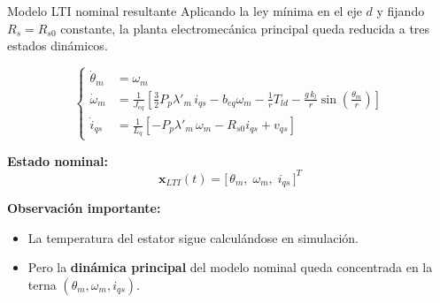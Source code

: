 \documentclass[aspectratio=169,t]{beamer}
\begin{document}
\begin{frame}{Modelo LTI nominal resultante}
{\small\color{uncGray}Aplicando la ley mínima en el eje $d$ y fijando $R_s=R_{s0}$ constante, la planta electromecánica principal queda reducida a tres estados dinámicos.}\par
\vspace{2mm}

\footnotesize
\begin{equation*}
\left\{
\begin{aligned}
\dot{\theta}_m &= \omega_m \\[2pt]
\dot{\omega}_m &= \frac{1}{J_{eq}}\!\left[\frac{3}{2}P_p\lambda'_m\,i_{qs}-b_{eq}\omega_m-\frac{1}{r}T_{ld}-\frac{g\,k_l}{r}\sin\!\left(\frac{\theta_m}{r}\right)\right] \\[4pt]
\dot{i}_{qs} &= \frac{1}{L_q}\!\left[-P_p\lambda'_m\,\omega_m-R_{s0}i_{qs}+v_{qs}\right]
\end{aligned}
\right.
\end{equation*}
\normalsize

\textbf{Estado nominal:}
\begin{equation*}
\bm{x}_{LTI}(t)=\big[\,\theta_m,\;\omega_m,\;i_{qs}\,\big]^T
\end{equation*}

\textbf{Observación importante:}
\begin{itemize}
  \item La temperatura del estator sigue calculándose en simulación.
  \item Pero la \textbf{dinámica principal} del modelo nominal queda concentrada en la terna $(\theta_m,\omega_m,i_{qs})$.
\end{itemize}
\end{frame}
\end{document}
